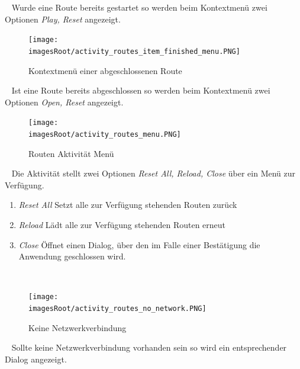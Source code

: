 \documentclass[11pt, a4paper, twoside]{article}   	%
\newcommand{\imagesRoot}{images}
\begin{document}
\ \newline
Wurde eine Route bereits gestartet so werden beim Kontextmenü zwei Optionen \emph{Play, Reset} angezeigt.
\newline
\begin{figure}[h]
	\centering
	\texttt{[image: \\imagesRoot/activity\_routes\_item\_finished\_menu.PNG]}
	\caption
	{Kontextmenü einer abgeschlossenen Route}
\end{figure}
\ \newline
Ist eine Route bereits abgeschlossen so werden beim Kontextmenü zwei Optionen \emph{Open, Reset} angezeigt.
\newpage
\begin{figure}[h]
	\centering
	\texttt{[image: \\imagesRoot/activity\_routes\_menu.PNG]}
	\caption
	{Routen Aktivität Menü}
\end{figure}
\ \newline
Die Aktivität stellt zwei Optionen \emph{Reset All, Reload,  Close} über ein Menü zur Verfügung.
\begin{enumerate}
	\item\emph{Reset All}
	\newline
	Setzt alle zur Verfügung stehenden Routen zurück
	\item\emph{Reload}
	\newline
	Lädt alle zur Verfügung stehenden Routen erneut
	\item\emph{Close}
	\newline
	Öffnet einen Dialog, über den im Falle einer Bestätigung die Anwendung geschlossen wird.
\end{enumerate}
\ \newline
\begin{figure}[h]
	\centering
	\texttt{[image: \\imagesRoot/activity\_routes\_no\_network.PNG]}
	\caption
	{Keine Netzwerkverbindung}
\end{figure}
\ \newline
Sollte keine Netzwerkverbindung vorhanden sein so wird ein entsprechender Dialog angezeigt.
\newpage
\end{document}
